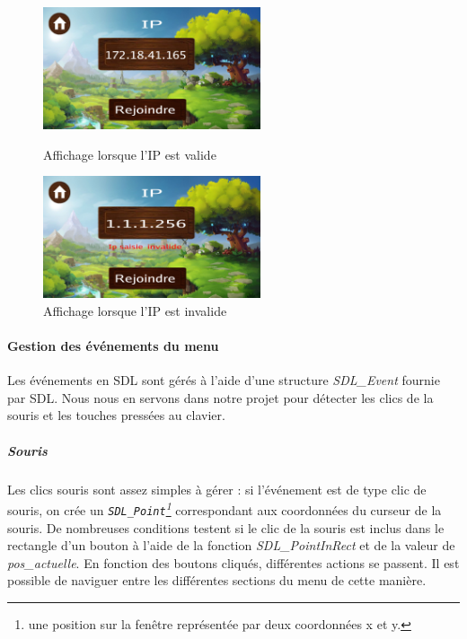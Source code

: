 \documentclass[11pt]{article}
\begin{document}
                \begin{figure}[H]
                    \centering
                    \begin{minipage}{0.45\textwidth}
                        \centering
                        \includegraphics[height=3.6cm]{screenIpOk.png}
                        \caption{Affichage lorsque l'IP est valide}
                        \label{fig:IPOK}
                    \end{minipage}
                    \hfill
                    \begin{minipage}{0.45\textwidth}
                        \centering
                        \includegraphics[height=3.6cm]{screenIpKo.png}
                        \caption{Affichage lorsque l'IP est invalide}
                        \label{fig:IPKO}
                    \end{minipage}
                \end{figure}
                \paragraph{Gestion des événements du menu}\leavevmode\newline
                Les événements en SDL sont gérés à l’aide d’une structure \textit{SDL\_Event} fournie par SDL. Nous nous en servons dans notre projet pour détecter les clics de la souris et les touches pressées au clavier. 

                    \subparagraph{Souris}\leavevmode\newline
                    Les clics souris sont assez simples à gérer : si l’événement est de type clic de souris, on crée un \textit{\texttt{SDL\_Point}\footnote{une position sur la fenêtre représentée par deux coordonnées x et y.}} correspondant aux coordonnées du curseur de la souris. De nombreuses conditions testent si le clic de la souris est inclus dans le rectangle d’un bouton à l’aide de la fonction \textit{SDL\_PointInRect} et de la valeur de \textit{pos\_actuelle}. En fonction des boutons cliqués, différentes actions se passent. Il est possible de naviguer entre les différentes sections du menu de cette manière. 
\end{document}
